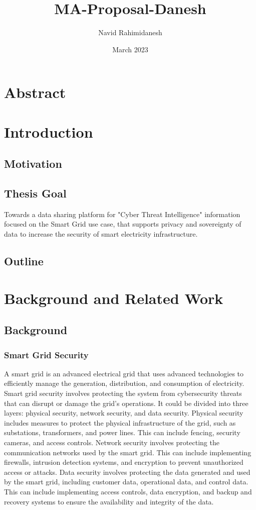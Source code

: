 \documentclass{article}
\title{MA-Proposal-Danesh}
\author{Navid Rahimidanesh}
\date{March 2023}
\begin{document}
\maketitle

\section{Abstract}

\section{Introduction} %

\subsection{Motivation}

\subsection{Thesis Goal}

Towards a data sharing platform for "Cyber Threat Intelligence" information focused on the Smart Grid use case, that supports privacy and sovereignty of data to increase the security of smart electricity infrastructure.

\subsection{Outline}


\section{Background and Related Work} %

\subsection{Background}
\subsubsection*{Smart Grid Security}
A smart grid is an advanced electrical grid that uses advanced technologies to efficiently manage the generation, distribution, and consumption of electricity. Smart grid security involves protecting the system from cybersecurity threats that can disrupt or damage the grid's operations. It could be divided into three layers: physical security, network security, and data security. Physical security includes measures to protect the physical infrastructure of the grid, such as substations, transformers, and power lines. This can include fencing, security cameras, and access controls. Network security involves protecting the communication networks used by the smart grid. This can include implementing firewalls, intrusion detection systems, and encryption to prevent unauthorized access or attacks. Data security involves protecting the data generated and used by the smart grid, including customer data, operational data, and control data. This can include implementing access controls, data encryption, and backup and recovery systems to ensure the availability and integrity of the data. 
\end{document}
